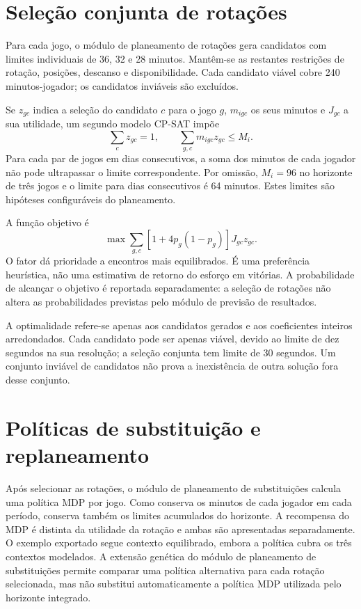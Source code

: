 \section{Seleção conjunta de rotações}

Para cada jogo, o módulo de planeamento de rotações gera candidatos com limites individuais de
36, 32 e 28 minutos. Mantêm-se as restantes restrições de rotação, posições,
descanso e disponibilidade. Cada candidato viável cobre 240 minutos-jogador;
os candidatos inviáveis são excluídos.

Se \(z_{gc}\) indica a seleção do candidato \(c\) para o jogo \(g\),
\(m_{igc}\) os seus minutos e \(J_{gc}\) a sua utilidade, um segundo
modelo CP-SAT impõe
\[
\sum_c z_{gc}=1,\qquad
\sum_{g,c}m_{igc}z_{gc}\leq M_i.
\]
Para cada par de jogos em dias consecutivos, a soma dos minutos de cada
jogador não pode ultrapassar o limite correspondente. Por omissão,
\(M_i=96\) no horizonte de três jogos e o limite para dias consecutivos
é 64 minutos. Estes limites são hipóteses configuráveis do planeamento.

A função objetivo é
\[
\max\sum_{g,c}\left[1+4p_g(1-p_g)\right]J_{gc}z_{gc}.
\]
O fator dá prioridade a encontros mais equilibrados. É uma preferência
heurística, não uma estimativa de retorno do esforço em vitórias.
A probabilidade de alcançar o objetivo é reportada separadamente: a
seleção de rotações não altera as probabilidades previstas pelo módulo de previsão de resultados.

A optimalidade refere-se apenas aos candidatos gerados e aos coeficientes
inteiros arredondados. Cada candidato pode ser apenas viável, devido ao
limite de dez segundos na sua resolução; a seleção conjunta tem limite
de 30 segundos. Um conjunto inviável de candidatos não prova a inexistência
de outra solução fora desse conjunto.

\section{Políticas de substituição e replaneamento}

Após selecionar as rotações, o módulo de planeamento de substituições calcula uma política MDP por
jogo. Como conserva os minutos de cada jogador em cada período, conserva
também os limites acumulados do horizonte. A recompensa do MDP é distinta
da utilidade da rotação e ambas são apresentadas separadamente. O exemplo
exportado segue contexto equilibrado, embora a política cubra os três
contextos modelados. A extensão genética do módulo de planeamento de substituições permite comparar
uma política alternativa para cada rotação selecionada, mas não substitui
automaticamente a política MDP utilizada pelo horizonte integrado.

